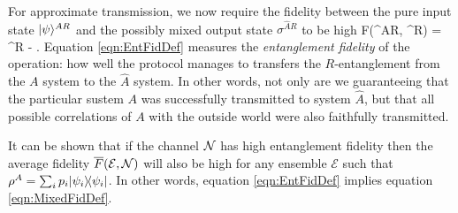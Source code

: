 \documentclass[aps,11pt,twoside,letterpaper]{article}
\def\E{\mathcal{E}}
\theoremstyle{plain}
\theoremstyle{definition}
\begin{document}
			
			For approximate transmission, we now require the fidelity between the pure input state $| \psi \rangle^{AR}$ 
			and the possibly mixed output state $\sigma^{\widehat{A}R}$ to be high
			\be	\label{eqn:EntFidDef}
				F(\ket{\psi}^{AR}, \sigma^{R}) 
					= 		 \sigma^{R} 
					 - \epsilon.
			\ee
			Equation \eqref{eqn:EntFidDef} measures the \emph{entanglement fidelity} of the operation: 
			how well the protocol manages to transfers the $R$-entanglement from the $A$ system to the $\widehat{A}$
			system. 
            In other words, not only are we guaranteeing that the particular sustem $A$ was successfully 
            transmitted to system $\widehat{A}$, but that all possible correlations of $A$ with the outside
            world were also faithfully transmitted.

			It can be shown \cite{EntFid} that if the channel ${\cal N}$ has high entanglement fidelity then the 
			average fidelity  $\bar{F}(\E, \cN)$ will also be high for any ensemble $\E$ such that 
			$\rho^A=\sum_i p_i | \psi_i \rangle\!\langle \psi_i |$.
			In other words, equation \eqref{eqn:EntFidDef} implies equation \eqref{eqn:MixedFidDef}.

					
\end{document}
